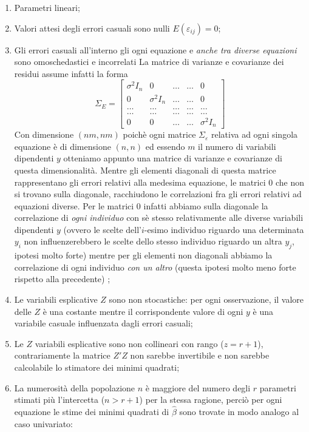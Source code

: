 \documentclass[a4page, 11pt]{article} %
\begin{document}
\begin{enumerate}[noitemsep]
\item Parametri lineari;
\item Valori attesi degli errori casuali sono nulli $E(\varepsilon_{ij}) = 0$;
\item Gli errori casuali all’interno gli ogni equazione e \textit{anche tra diverse equazioni} sono omoschedastici e incorrelati  La matrice di varianze e covarianze dei residui assume infatti la forma
\[ \Sigma_{E} = 
\begin{bmatrix}
\sigma^2 I_n & 0 & \dots & \dots & 0 \\
0 & \sigma^2 I_n & \dots & \dots &  0 \\
\dots&\dots&\dots&\dots&\dots \\
\dots&\dots&\dots&\dots&\dots \\
0 & 0 & \dots & \dots & \sigma^2 I_n
\end{bmatrix}
\]
Con dimensione $(nm,nm)$ poichè ogni matrice $\Sigma_\varepsilon$ relativa ad ogni singola equazione è di dimensione $(n,n)$ ed essendo $m$ il numero di variabili dipendenti $y$ otteniamo appunto una matrice di varianze e covarianze di questa dimensionalità. Mentre gli elementi diagonali di questa matrice rappresentano gli errori relativi alla medesima equazione, le matrici $0$ che non si trovano sulla diagonale, racchiudono le correlazioni fra gli errori relativi ad equazioni diverse. Per le matrici $0$ infatti abbiamo sulla diagonale la correlazione di \textit{ogni individuo} con sè stesso relativamente alle diverse variabili dipendenti $y$ (ovvero le scelte dell'$i$-esimo individuo riguardo una determinata $y_i$ non influenzerebbero le scelte dello stesso individuo riguardo un altra $y_j$, ipotesi molto forte) mentre per gli elementi non diagonali abbiamo la correlazione di ogni individuo \textit{con un altro} (questa ipotesi molto meno forte rispetto alla precedente) ;
\item Le  variabili esplicative $Z$ sono non stocastiche: per ogni osservazione, il valore delle $Z$ è una costante mentre il corrispondente valore di ogni $y$ è una variabile casuale influenzata dagli errori casuali;
\item Le $Z$ variabili esplicative sono non collineari con rango ($z=r+1$), contrariamente la matrice $Z'Z$ non sarebbe invertibile e non sarebbe calcolabile lo stimatore dei minimi quadrati;
\item La numerosità della popolazione $n$ è maggiore del numero degli $r$ parametri stimati più l'intercetta ($n > r+1$) per la stessa ragione, perciò per ogni equazione le stime dei minimi quadrati di $\hat{\beta}$ sono trovate in modo analogo al caso univariato:

\end{enumerate}
\end{document}
